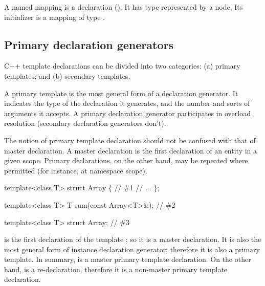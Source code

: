 \documentclass[a4paper,12pt]{article}
\begin{document}
A named mapping is a declaration ().  It has type represented
by a  node.  Its initializer is a mapping of type
.



\subsection{Primary declaration generators}
\label{sec:named-mapping:primary}

C++ template declarations can be divided into two categories:
(a) primary templates; and (b) secondary templates.

A primary template is the most general form of a declaration generator.
It indicates the type of the declaration it generates, and the number and
sorts of arguments it accepts.  A primary declaration generator participates
in overload resolution (secondary declaration generators don't).

The notion of primary template declaration should not be confused with that of
master declaration.  A master declaration is the first  declaration of an
entity in a given scope.  Primary declarations, on the other hand, may be
repeated where permitted (for instance, at namespace scope).   
\begin{Program}
  template<class T>
     struct Array \{                         // \#1
        // ...
     \};
  
  template<class T>
     T sum(const Array<T>&);                // \#2
 
  template<class T> 
     struct Array;                          // \#3
\end{Program}
 is the first declaration of the template ; so it is 
a master declaration.  It is also the most general form of 
 instance declaration generator;
therefore it is also a primary template.  In summary,  is a master
primary template declaration.  On the other hand,  is a
re-declaration, therefore it is a non-master primary template declaration.
\end{document}
